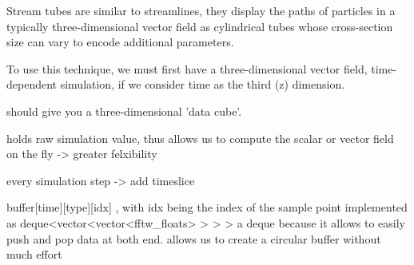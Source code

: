 
 Stream tubes are similar to streamlines, they display the paths of particles in a typically three-dimensional vector field as cylindrical tubes whose cross-section size can vary to encode additional parameters.
 
 To use this technique, we must first have a three-dimensional vector field,
 time-dependent simulation, if we consider time as the third (z) dimension. 
 
 should give you a three-dimensional 'data cube'. 
 
 holds raw simulation value, thus allows us to compute the scalar or vector field on the fly -> greater felxibility
 
 every simulation step -> add timeslice
 
 buffer[time][type][idx] , with idx being the index of the sample point implemented as 
 deque<vector<vector<fftw_floats> > > >
a deque  because it allows to easily push and pop data at both end. 
allows us to create a circular buffer without much effort
  
  
  
  
 
 
 
 
 
